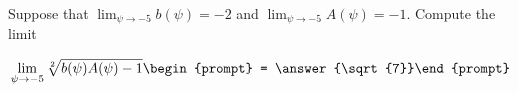 \documentclass{ximera}
\author{Matthew Carr}
\begin{document}
\begin{exercise}
Suppose that $\lim_{\psi\to-5}b(\psi)=-2$ and $\lim_{\psi\to-5}A(\psi)=-1$. Compute the limit

\[
\lim_{\psi\to -5 } \sqrt[2]{b(\psi)A(\psi)-1}\begin{prompt} = \answer{\sqrt{7}}\end{prompt}
\]
\end{exercise}
\end{document}
